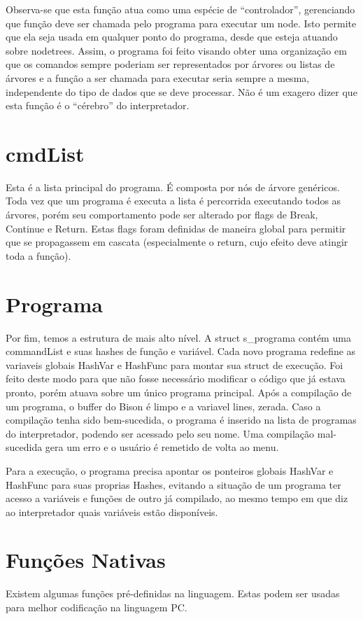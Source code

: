 \documentclass[a4paper,10pt]{article}
\begin{document}
Observa-se que esta função atua como uma espécie de ``controlador'', gerenciando que função deve ser chamada pelo programa para executar um node. Isto
permite que ela seja usada em qualquer ponto do programa, desde que esteja atuando sobre nodetrees. Assim, o programa foi feito visando obter uma organização
em que os comandos sempre poderiam ser representados por árvores ou listas de árvores e a função a ser chamada para executar seria sempre a mesma, independente
do tipo de dados que se deve processar. Não é um exagero dizer que esta função é o ``cérebro'' do interpretador.
\section{cmdList}

Esta é a lista principal do programa. É composta por nós de árvore genéricos. Toda vez que um programa é executa a lista é percorrida executando todos as árvores, porém
seu comportamento pode ser alterado por flags de Break, Continue e Return. Estas flags foram definidas de maneira global para permitir que se propagassem
em cascata (especialmente o return, cujo efeito deve atingir toda a função).

\section{Programa}
Por fim, temos a estrutura de mais alto nível. A struct s\_programa contém uma commandList e suas hashes de função e variável. Cada novo programa redefine
as variaveis globais HashVar e HashFunc para montar sua struct de execução. Foi feito deste modo para que não fosse necessário modificar o código que já
estava pronto, porém atuava sobre um único programa principal. Após a compilação de um programa, o buffer do Bison é limpo e a variavel lines, zerada.
Caso a compilação tenha sido bem-sucedida, o programa é inserido na lista de programas do interpretador, podendo ser acessado pelo seu nome. Uma compilação
mal-sucedida gera um erro e o usuário é remetido de volta ao menu.

Para a execução, o programa precisa apontar os ponteiros globais HashVar e HashFunc para suas proprias Hashes, evitando a situação de um programa
ter acesso a variáveis e funções de outro já compilado, ao mesmo tempo em que diz ao interpretador quais variáveis estão disponíveis.

\section{Funções Nativas}
Existem algumas funções pré-definidas na linguagem. Estas podem ser usadas para melhor codificação na linguagem PC.
\end{document}
